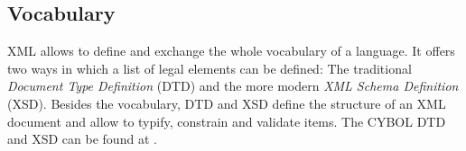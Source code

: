 %
%
%
%
%
%
%

\subsection{Vocabulary}
\label{vocabulary_heading}

XML allows to define and exchange the whole vocabulary of a language. It offers
two ways in which a list of legal elements can be defined: The traditional
\emph{Document Type Definition} (DTD) and the more modern \emph{XML Schema
Definition} (XSD). Besides the vocabulary, DTD and XSD define the structure of
an XML document and allow to typify, constrain and validate items. The CYBOL DTD
and XSD can be found at \cite{cybop}.
